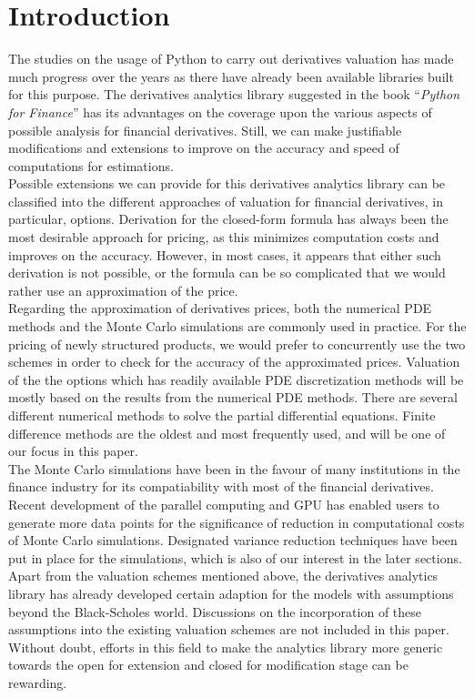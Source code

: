 \section{Introduction}
The studies on the usage of Python to carry out derivatives valuation has made much progress over the years as there have already been available libraries built for this purpose. The derivatives analytics library suggested in the book ``\emph{Python for Finance}'' has its advantages on the coverage upon the various aspects of possible analysis for financial derivatives. Still, we can make justifiable modifications and extensions to improve on the accuracy and speed of computations for estimations. \\[1mm]
Possible extensions we can provide for this derivatives analytics library can be classified into the different approaches of valuation for financial derivatives, in particular, options. Derivation for the closed-form formula has always been the most desirable approach for pricing, as this minimizes computation costs and improves on the accuracy. However, in most cases, it appears that either such derivation is not possible, or the formula can be so complicated that we would rather use an approximation of the price.\\[1mm]
Regarding the approximation of derivatives prices, both the numerical PDE methods and the Monte Carlo simulations are commonly used in practice. For the pricing of newly structured products, we would prefer to concurrently use the two schemes in order to check for the accuracy of the approximated prices. Valuation of the the options which has readily available PDE discretization methods will be mostly based on the results from the numerical PDE methods. There are several different numerical methods to solve the partial differential equations. Finite difference methods are the oldest and most frequently used, and will be one of our focus in this paper.\\[1mm]
The Monte Carlo simulations have been in the favour of many institutions in the finance industry for its compatiability with most of the financial derivatives. Recent development of the parallel computing and GPU has enabled users to generate more data points for the significance of reduction in computational costs of Monte Carlo simulations. Designated variance reduction techniques have been put in place for the simulations, which is also of our interest in the later sections.\\[1mm]
Apart from the valuation schemes mentioned above, the derivatives analytics library has already developed certain adaption for the models with assumptions beyond the Black-Scholes world. Discussions on the incorporation of these assumptions into the existing valuation schemes are not included in this paper. Without doubt, efforts in this field to make the analytics library more generic towards the open for extension and closed for modification stage can be rewarding.
\newpage

